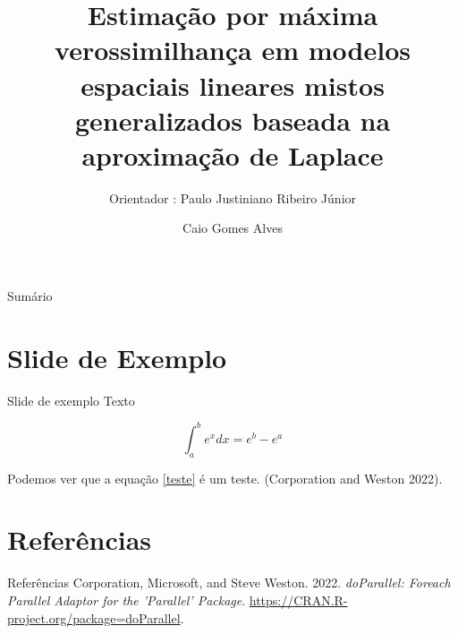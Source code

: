 \documentclass[10pt,ignorenonframetext,aspectratio=169,notes=hide,]{beamer}
\title{Estimação por máxima verossimilhança em modelos espaciais
lineares mistos generalizados baseada na aproximação de Laplace}
\subtitle{Orientador : Paulo Justiniano Ribeiro Júnior}
\author[]{Caio Gomes Alves}
\newenvironment{CSLReferences}%
  {}%
  {\par}
\begin{document}
\frame{\titlepage}

\begin{frame}{Sumário}
\tableofcontents
\end{frame}
\section{Slide de Exemplo}\label{slide-de-exemplo}

\begin{frame}{Slide de exemplo}
\label{slide-de-exemplo-1}
Texto

\begin{equation}
\label{teste}
\int_{a}^{b}e^x dx = e^{b}-e^{a}
\end{equation}

Podemos ver que a equação \ref{teste} é um teste. (Corporation and
Weston 2022).
\end{frame}

\section*{Referências}\label{referuxeancias}

\begin{frame}{Referências}
\label{refs}
\begin{CSLReferences}{1}{0}
Corporation, Microsoft, and Steve Weston. 2022. \emph{doParallel:
Foreach Parallel Adaptor for the 'Parallel' Package}.
\url{https://CRAN.R-project.org/package=doParallel}.

\end{CSLReferences}
\end{frame}
\end{document}
